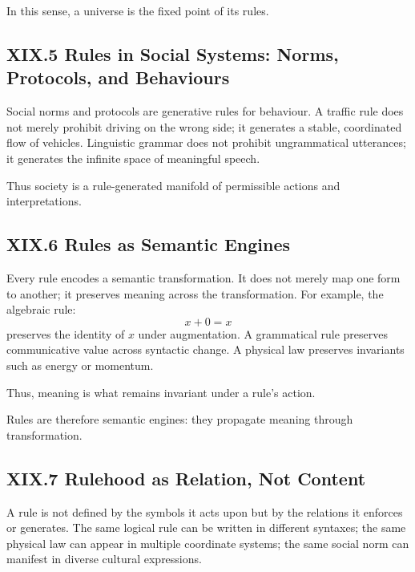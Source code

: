 \documentclass[11pt,letterpaper]{article}
\begin{document}
In this sense, a universe is the fixed point of its rules.

\subsection{XIX.5 Rules in Social Systems: Norms, Protocols, and Behaviours}

Social norms and protocols are generative rules for behaviour. A traffic rule does not merely prohibit driving on the wrong side; it generates a stable, coordinated flow of vehicles. Linguistic grammar does not prohibit ungrammatical utterances; it generates the infinite space of meaningful speech.

Thus society is a rule-generated manifold of permissible actions and interpretations.

\subsection{XIX.6 Rules as Semantic Engines}

Every rule encodes a semantic transformation. It does not merely map one form to another; it preserves meaning across the transformation. For example, the algebraic rule:
\[
x + 0 = x
\]
preserves the identity of \(x\) under augmentation. A grammatical rule preserves communicative value across syntactic change. A physical law preserves invariants such as energy or momentum.

Thus, meaning is what remains invariant under a rule’s action.

Rules are therefore semantic engines: they propagate meaning through transformation.

\subsection{XIX.7 Rulehood as Relation, Not Content}

A rule is not defined by the symbols it acts upon but by the relations it enforces or generates. The same logical rule can be written in different syntaxes; the same physical law can appear in multiple coordinate systems; the same social norm can manifest in diverse cultural expressions.
\end{document}
